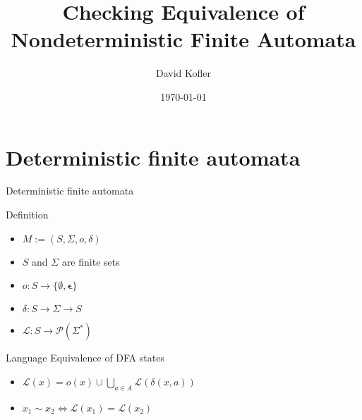 \documentclass[compress]{beamer}
\title{Checking Equivalence of Nondeterministic Finite Automata}
\author{David Kofler}
\date{\today}
\institute{University of Innsbruck \newline Institute of Computer Science}
\begin{document}
\begin{frame}{}
	\maketitle
\end{frame}

\begin{frame}{}
	\tableofcontents
\end{frame}

\section{Deterministic finite automata}

\begin{frame}{Deterministic finite automata}
  \begin{block}{Definition}
    \begin{itemize}
      \item $M := (S, \Sigma, o, \delta)$
      \item $S$ and $\Sigma$ are finite sets
      \item $o : S \to \{\emptyset, \mathbf{\epsilon} \}$
      \item $\delta : S \to \Sigma \to S$
      \item $\mathcal{L} : S \to \mathcal{P}(\Sigma^\ast)$
    \end{itemize}
  \end{block}

  \begin{block}{Language Equivalence of DFA states}
    \begin{itemize}
      \item $\mathcal{L}(x) = o(x) \cup \bigcup_{a \in A}{\mathcal{L}({\delta(x, a)})}$
      \item $x_1 \sim x_2 \Leftrightarrow \mathcal{L}(x_1) = \mathcal{L}(x_2)$
    \end{itemize}
  \end{block}
\end{frame}
\end{document}
